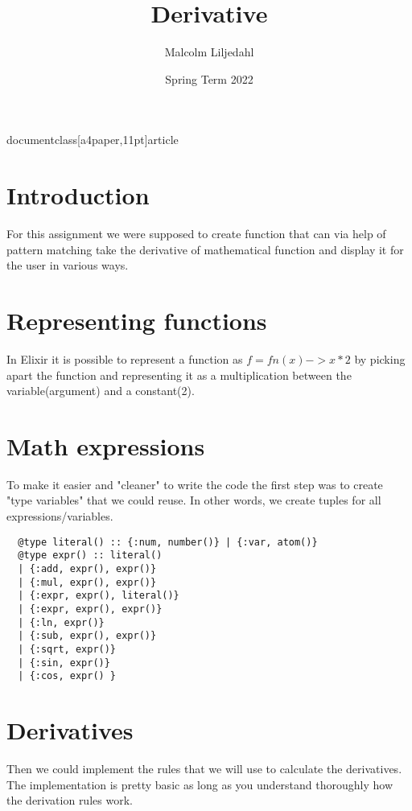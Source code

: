 documentclass[a4paper,11pt]{article}

\usepackage[utf8]{inputenc}

\usepackage{minted}



\title{
    \textbf{Derivative}
}
\author{Malcolm Liljedahl}
\date{Spring Term 2022}

\maketitle

\section*{Introduction}

For this assignment we were supposed to create function that can via help of pattern matching take the derivative of mathematical function and display it for the user in various ways.

\section{Representing functions}

In Elixir it is possible to represent a function as  $f = fn(x) -> x * 2 $ by picking apart the function and representing it as a multiplication between the variable(argument) and a constant(2).

\section{Math expressions}

To make it easier and "cleaner" to write the code the first step was to create "type variables" that we could reuse. In other words, we create tuples for all expressions/variables.

\begin{verbatim}
  @type literal() :: {:num, number()} | {:var, atom()}
  @type expr() :: literal()
  | {:add, expr(), expr()}
  | {:mul, expr(), expr()}
  | {:expr, expr(), literal()}
  | {:expr, expr(), expr()}
  | {:ln, expr()}
  | {:sub, expr(), expr()}
  | {:sqrt, expr()}
  | {:sin, expr()}
  | {:cos, expr() }
\end{verbatim}

\section{Derivatives}
Then we could implement the rules that we will use to calculate the derivatives. The implementation is pretty basic as long as you understand thoroughly how the derivation rules work.


